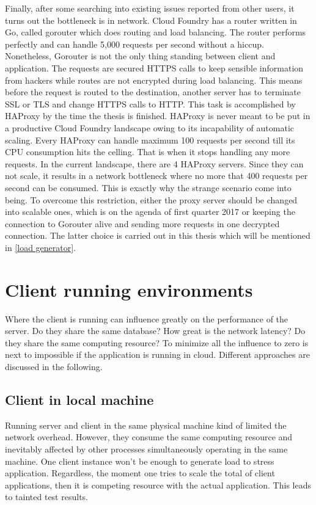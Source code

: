 Finally, after some searching into existing issues reported from other users, it turns out the bottleneck is in network. Cloud Foundry has a router written in Go, called gorouter  \citep{Gorouter} which does routing and load balancing. The router performs perfectly and can handle 5,000 requests per second without a hiccup. Nonetheless, Gorouter is not the only thing standing between client and application. The requests are secured HTTPS calls to keep sensible information from hackers while routes are not encrypted during load balancing. This means before the request is routed to the destination, another server has to terminate SSL or TLS and change HTTPS calls to HTTP. This task is accomplished by \ac{HAProxy} \citep{HAProxy} by the time the thesis is finished. HAProxy is never meant to be put in a productive Cloud Foundry landscape owing to its incapability of automatic scaling. Every HAProxy can handle maximum 100 requests per second till its CPU consumption hits the celling. That is when it stops handling any more requests. In the current landscape, there are 4 HAProxy servers. Since they can not scale, it results in a network bottleneck where no more that 400 requests per second can be consumed. This is exactly why the strange scenario come into being. To overcome this restriction, either the proxy server should be changed into scalable ones, which is on the agenda of first quarter 2017 or keeping the connection to Gorouter alive and sending more requests in one decrypted connection. The latter choice is carried out in this thesis which will be mentioned in \ref{load generator}.


\section{ Client running environments}
Where the client is running can influence greatly on the performance of the server. Do they share the same database? How great is the network latency? Do they share the same computing resource? To minimize all the influence to zero is next to impossible if the application is running in cloud. Different approaches are discussed in the following. 

\subsection{Client in local machine}
Running server and client in the same physical machine kind of limited the network overhead. However, they consume the same computing resource and inevitably affected by other processes simultaneously operating in the same machine. One client instance won't be enough to generate load to stress application. Regardless, the moment one tries to scale the total of client applications, then it is competing resource with the actual application. This leads to tainted test results.  
